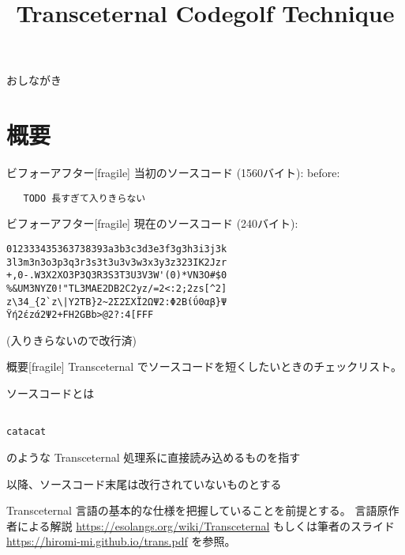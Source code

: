 \documentclass[12pt,unicode]{beamer}
\title{Transceternal Codegolf Technique}
\begin{document}
\begin{frame}
   \titlepage{}
\end{frame}

\begin{frame}{おしながき}
   \tableofcontents
\end{frame}
\section{概要}

\begin{frame}{ビフォーアフター}[fragile]
   当初のソースコード (1560バイト):
   before:
   \begin{verbatim}
   TODO 長すぎて入りきらない
   \end{verbatim}
\end{frame}
\begin{frame}{ビフォーアフター}[fragile]
   現在のソースコード (240バイト):
   \begin{verbatim}
012333435363738393a3b3c3d3e3f3g3h3i3j3k
3l3m3n3o3p3q3r3s3t3u3v3w3x3y3z323IK2Jzr
+,0-.W3X2XO3P3Q3R3S3T3U3V3W'(0)*VN3O#$0
%&UM3NYZ0!"TL3MAE2DB2C2yz/=2<:2;2zs[^2]
z\34_{2`z\|Υ2ΤB}2~2Σ2ΣΧΪ2ΩΨ2:Φ2Bίΰ0αβ}Ψ
Ϋή2έzά2Ψ2+FH2GBb>@2?:4[FFF
   \end{verbatim}
   (入りきらないので改行済)
\end{frame}

\begin{frame}{概要}[fragile]
Transceternal でソースコードを短くしたいときのチェックリスト。

ソースコードとは

\begin{verbatim}

catacat

\end{verbatim}

のような Transceternal 処理系に直接読み込めるものを指す

以降、ソースコード末尾は改行されていないものとする

   Transceternal 言語の基本的な仕様を把握していることを前提とする。
   言語原作者による解説 \url{https://esolangs.org/wiki/Transceternal}
   もしくは筆者のスライド \url{https://hiromi-mi.github.io/trans.pdf} を参照。

\end{frame}
\end{document}

